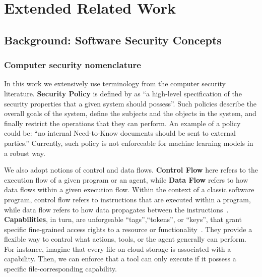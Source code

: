 \documentclass[11pt, a4paper, logo, copyright]{googledeepmind}
\begin{document}
\newpage
\printbibliography









\appendix

\section{Extended Related Work}
\subsection{Background: Software Security Concepts}

\subsubsection{Computer security nomenclature}\label{sec:nomenclature}

In this work we extensively use terminology from the computer security literature. \textbf{Security Policy} is defined by \citet{anderson2002security} as ``a high-level specification of the security properties that a given system should possess''. Such policies describe the overall goals of the system, define the subjects and the objects in the system, and finally restrict the operations that they can perform. An example of a policy could be: ``no internal Need-to-Know documents should be sent to external parties.'' Currently, such policy is not enforceable for machine learning models in a robust way.

We also adopt notions of control and data flows. \textbf{Control Flow} here refers to the execution flow of a given program or an agent, while \textbf{Data Flow} refers to how data flows within a given execution flow. Within the context of a classic software program, control flow refers to instructions that are executed within a program, while data flow refers to how data propagates between the instructions~\citep{abadi2009control}. \textbf{Capabilities}, in turn, are unforgeable ``tags'',``tokens'', or ``keys'', that grant specific fine-grained access rights to a resource or functionality~\citep{needham1977cambridge}. They provide a flexible way to control what actions, tools, or the agent generally can perform. For instance, imagine that every file on cloud storage is associated with a capability. Then, we can enforce that a tool can only execute if it possess a specific file-corresponding capability.
\end{document}
